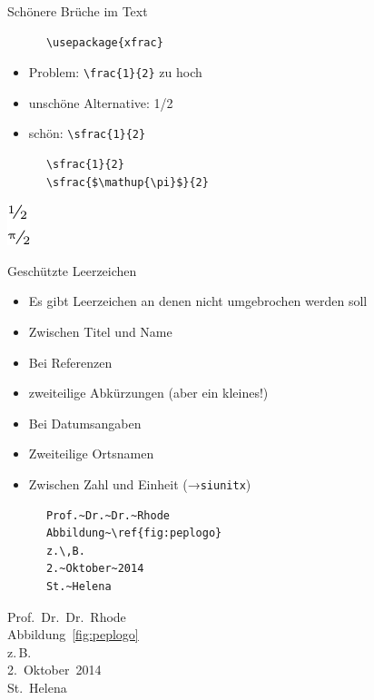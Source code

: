 \begin{frame}[fragile]{Schönere Brüche im Text}
  \begin{Packages}
    \begin{lstlisting}
      \usepackage{xfrac}
    \end{lstlisting}
  \end{Packages}
  \begin{itemize}
    \item Problem: \lstinline+\frac{1}{2}+ zu hoch
    \item unschöne Alternative: 1/2
    \item schön: \lstinline+\sfrac{1}{2}+
  \end{itemize}
  \begin{CodeExample}{0.5}
    \begin{lstlisting}
      \sfrac{1}{2}
      \sfrac{$\mathup{\pi}$}{2}
    \end{lstlisting}
  \CodeResult
    \includegraphics[scale=0.8]{figures/xfrac.pdf}
  \end{CodeExample}
\end{frame}

\begin{frame}[fragile]{Geschützte Leerzeichen}
  \begin{itemize}
    \item Es gibt Leerzeichen an denen nicht umgebrochen werden soll
    \item Zwischen Titel und Name
    \item Bei Referenzen
    \item zweiteilige Abkürzungen (aber ein kleines!)
    \item Bei Datumsangaben
    \item Zweiteilige Ortsnamen
    \item Zwischen Zahl und Einheit (→\texttt{siunitx})
  \end{itemize}
  \begin{CodeExample}{0.5}
    \begin{lstlisting}
      Prof.~Dr.~Dr.~Rhode
      Abbildung~\ref{fig:peplogo}
      z.\,B.
      2.~Oktober~2014
      St.~Helena
    \end{lstlisting}
    \CodeResult
      Prof.~Dr.~Dr.~Rhode \\
      Abbildung~\ref{fig:peplogo} \\
      z.\,B. \\
      2.~Oktober~2014 \\
      St.~Helena
  \end{CodeExample}
\end{frame}

